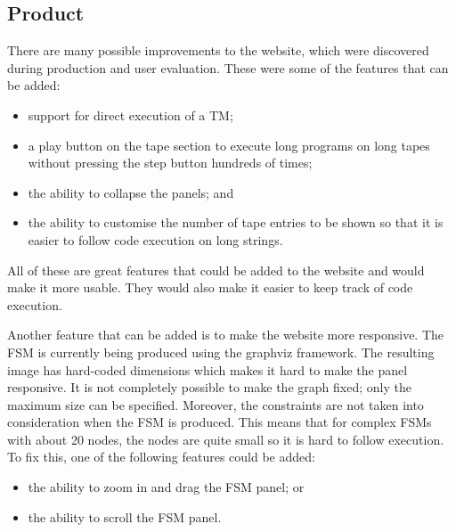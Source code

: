  \subsection{Product}
There are many possible improvements to the website, which were discovered during production and user evaluation. These were some of the features that can be added:
\begin{itemize}
    \item support for direct execution of a TM;
    \item a play button on the tape section to execute long programs on long tapes without pressing the step button hundreds of times;
    \item the ability to collapse the panels; and
    \item the ability to customise the number of tape entries to be shown so that it is easier to follow code execution on long strings.
\end{itemize}
All of these are great features that could be added to the website and would make it more usable. They would also make it easier to keep track of code execution. 

Another feature that can be added is to make the website more responsive. The FSM is currently being produced using the graphviz framework. The resulting image has hard-coded dimensions which makes it hard to make the panel responsive. It is not completely possible to make the graph fixed; only the maximum size can be specified. Moreover, the constraints are not taken into consideration when the FSM is produced. This means that for complex FSMs with about 20 nodes, the nodes are quite small so it is hard to follow execution. To fix this, one of the following features could be added:
\begin{itemize}
    \item the ability to zoom in and drag the FSM panel; or
    \item the ability to scroll the FSM panel.
\end{itemize}


